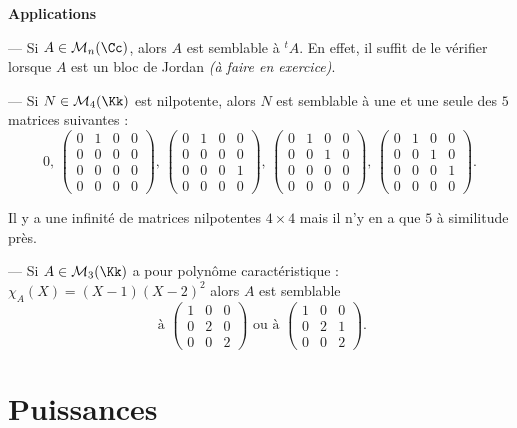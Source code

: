 \documentclass[class=report,crop=false]{standalone}
\newcommand{\exoo}{\emph{(à faire en exercice)}}
\begin{document}
{\bf Applications}

--- Si $A \in \mathcal{M}_n(\Cc)$, alors $A$ est semblable à ${}^t A$. En effet, il suffit de le vérifier lorsque $A$ est un bloc de Jordan \exoo.

--- Si $N\in \mathcal{M}_4(\Kk)$ est nilpotente, alors $N$ est semblable à une et une seule  des $5$ matrices suivantes  :
\[0, \, \left(\begin{array}{cccc}
0&1&0&0\\
0&0&0&0\\
0&0&0&0\\
0&0&0&0
\end{array}\right) ,\,\left(\begin{array}{cccc}
0&1&0&0\\
0&0&0&0\\
0&0&0&1\\
0&0&0&0
\end{array}\right),\,\left(\begin{array}{cccc}
0&1&0&0\\
0&0&1&0\\
0&0&0&0\\
0&0&0&0
\end{array}\right),\, \left(\begin{array}{cccc}
0&1&0&0\\
0&0&1&0\\
0&0&0&1\\
0&0&0&0
\end{array}\right). \] 

Il y a une infinité de matrices nilpotentes $4 \times 4$ mais il n'y en a que $5$ à similitude près.

--- Si $A \in \mathcal{M}_3(\Kk)$ a pour polynôme caractéristique : $ \chi_A(X) = (X-1)(X-2)^2$ alors $A$ est semblable 
\[\mbox{ à } \left(\begin{array}{ccc}
1&0&0\\
0&2&0\\
0&0&2
\end{array}\right) \mbox{ ou à } \left(\begin{array}{cccc}
1&0&0\\
0&2&1\\
0&0&2
\end{array}\right) .\]

\chapter{Puissances}
\end{document}
